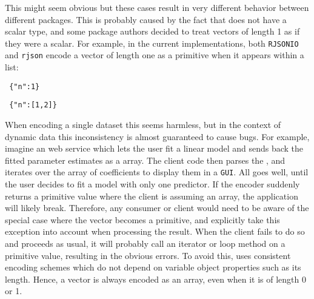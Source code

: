 This might seem obvious but these cases result in very different behavior between different \JSON packages. This is probably caused by the fact that \R does not have a scalar type, and some package authors decided to treat vectors of length 1 as if they were a scalar. For example, in the current implementations, both \texttt{RJSONIO} and \texttt{rjson} encode a vector of length one as a \JSON primitive when it appears within a list: 

\begin{knitrout}\mycodesize
{}\color{fgcolor}\begin{kframe}
\begin{alltt}
\hlstd{(}\hlstd{(} \hlstd{=} \hlstd{(}\hlstd{))))}
\end{alltt}
\begin{verbatim}
 {"n":1}
\end{verbatim}
\begin{alltt}
\hlstd{(}\hlstd{(} \hlstd{=} \hlstd{(}\hlstd{,} \hlstd{))))}
\end{alltt}
\begin{verbatim}
 {"n":[1,2]}
\end{verbatim}
\end{kframe}
\end{knitrout}

When encoding a single dataset this seems harmless, but in the context of dynamic data this inconsistency is almost guaranteed to cause bugs. For example, imagine an \R web service which lets the user fit a linear model and sends back the fitted parameter estimates as a \JSON array. The client code then parses the \JSON, and iterates over the array of coefficients to display them in a \texttt{GUI}. All goes well, until the user decides to fit a model with only one predictor. If the \JSON encoder suddenly returns a primitive value where the client is assuming an array, the application will likely break. Therefore, any consumer or client would need to be aware of the special case where the vector becomes a primitive, and explicitly take this exception into account when processing the result. When the client fails to do so and proceeds as usual, it will probably call an iterator or loop method on a primitive value, resulting in the obvious errors. To avoid this, \jsonlite uses consistent encoding schemes which do not depend on variable object properties such as its length. Hence, a vector is always encoded as an array, even when it is of length 0 or 1.


